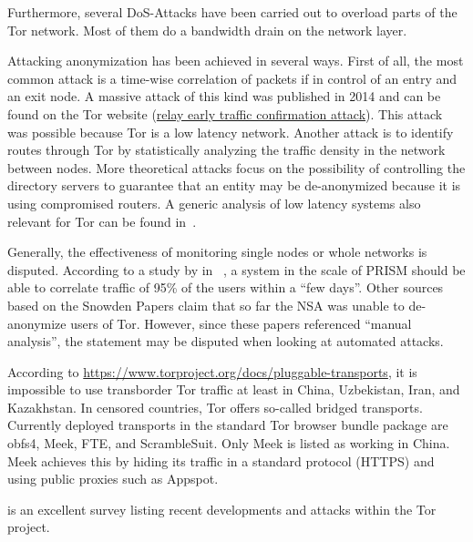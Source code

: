 Furthermore, several DoS-Attacks have been carried out to overload parts of the Tor network. Most of them do a bandwidth drain on the network layer.

Attacking anonymization has been achieved in several ways. First of all, the most common attack is a time-wise correlation of packets if in control of an entry and an exit node. A massive attack of this kind was published in 2014 and can be found on the Tor website (\href{https://blog.torproject.org/blog/tor-security-advisory-relay-early-traffic-confirmation-attack}{relay early traffic confirmation attack}). This attack was possible because Tor is a low latency network. Another attack is to identify routes through Tor by statistically analyzing the traffic density in the network between nodes. More theoretical attacks focus on the possibility of controlling the directory servers to guarantee that an entity may be de-anonymized because it is using compromised routers. A generic analysis of low latency systems also relevant for Tor can be found in~\cite{johnson2009design}.

Generally, the effectiveness of monitoring single nodes or whole networks is disputed. According to a study by \citeauthor{ccs2013-usersrouted} in \citeyear{ccs2013-usersrouted}~\cite{ccs2013-usersrouted}, a system in the scale of PRISM should be able to correlate traffic of 95\% of the users within a ``few days''. Other sources based on the Snowden Papers claim that so far the NSA was unable to de-anonymize users of  Tor. However, since these papers referenced ``manual analysis'', the statement may be disputed when looking at automated attacks.

According to \url{https://www.torproject.org/docs/pluggable-transports}, it is impossible to use transborder Tor traffic at least in China, Uzbekistan, Iran, and Kazakhstan. In censored countries, Tor offers so-called bridged transports. Currently deployed transports in the standard Tor browser bundle package are obfs4, Meek, FTE, and ScrambleSuit. Only Meek is listed as working in China. Meek achieves this by hiding its traffic in a standard protocol (HTTPS) and using public proxies such as Appspot.

\cite{saleh2018shedding} is an excellent survey listing recent developments and attacks within the Tor project.

